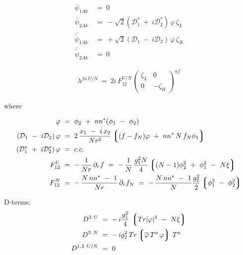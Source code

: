 \documentclass[12pt]{article}
\newcommand{\p}{\partial}
\newcommand{\md}{\mathcal{D}}
\newcommand{\ov}{\overline}
\begin{document}
\begin{align*}
\ov{\psi}_{\dot{1}Ak} & ~=~ 0 \\
\ov{\psi}_{\dot{2}Ak} & ~=~ - \sqrt{2} (\md_1^* ~+~ i \md_2^*)\, 
				\varphi\,  \zeta_L \\
\ov{\tilde{\psi}}_{\dot{1}Ak} & ~=~ + \sqrt{2} (\md_1 ~-~ i \md_2)\, \varphi\, \zeta_R \\
\ov{\tilde{\psi}}_{\dot{2}Ak} & ~=~ 0
\end{align*}


\begin{align*}
\lambda^{f\alpha\ U/N}  ~=~  2i\, F_{12}^{U/N} \begin{pmatrix}
					              \zeta_L  & 0 \\
						      0        & -\zeta_R 
					      \end{pmatrix}^{\alpha f}
\end{align*}
 
where

\begin{align*}
	\varphi & ~=~ \phi_2 ~+~ nn^* (\phi_1 ~-~ \phi_2) \\
	(\md_1 ~-~ i \md_2)\, \varphi & ~=~
		2\, \frac{x_1 ~-~ i\, x_2}
			{ N r^2}  
		\left\lgroup  (f - f_N) \varphi ~+~ nn^*\, N\, f_N \phi_1 \right\rgroup \\
	(\md_1^* ~+~ i \md_2^*)\, \varphi & ~=~  c. c. \\
	F_{12}^U & ~=~  - \,\frac{1}{N r}\, \p_r f ~=~
		-\, \frac{1}{N}\, \frac{g_1^2 N}{4} 
		\left\lgroup (N-1) \phi_2^2 ~+~ \phi_1^2 ~-~ N\xi \right\rgroup \\
	F_{12}^N & ~=~  -\, \frac{ N \, nn^* ~-~ 1} { N r}\,  \p_r f_N ~=~
		-\, \frac{ N\, nn^* ~-~ 1}{N} \frac{g_2^2}{2} 
		\left\lgroup \phi_1^2 ~-~ \phi_2^2  \right\rgroup
\end{align*}

D-terms:
\begin{align*}
	D^{3\ U} & ~=~ -\, i \frac{g_1^2}{4}\, \left\lgroup Tr | \varphi |^2 ~-~ N \xi \right\rgroup \\
	D^{3\ N} & ~=~ -\, i g_2^2\, Tr \left\lgroup \ov{\varphi}\, T^a\, \varphi \right\rgroup\, T^a \\
	D^{1,2\ U/N} & ~=~ 0
\end{align*}
\end{document}
